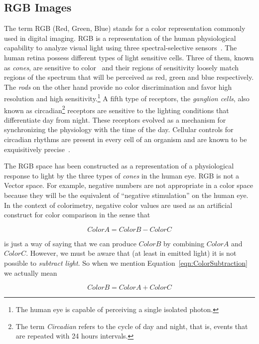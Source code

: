 \subsection{RGB Images}

The term RGB (Red, Green, Blue) stands for a color representation commonly used
in digital imaging. RGB is a representation of the human physiological
capability to analyze visual light using three spectral-selective
sensors~\cite{Malacara2002,Wyszecki2000}. The human retina possess different
types of light sensitive cells. Three of them, known as \emph{cones}, are
sensitive to color~\cite{Gray2003} and their regions of sensitivity loosely
match regions of the spectrum that will be perceived as red, green and blue
respectively. The \emph{rods} on the other hand provide no color discrimination
and favor high resolution and high sensitivity.\footnote{The human eye is
capable of perceiving a single isolated photon.} A fifth type of receptors,
the \emph{ganglion cells}, also known as circadian\footnote{The term
\emph{Circadian} refers to the cycle of day and night, that is, events that are
repeated with 24 hours intervals.} receptors are sensitive to the lighting
conditions that differentiate day from night. These receptors evolved as a
mechanism for synchronizing the physiology with the time of the day. Cellular
controls for circadian rhythms are present in every cell of an organism and are
known to be exquisitively precise~\cite{Lodish2000}.

The RGB space has been constructed as a representation of a physiological
response to light by the three types of \emph{cones} in the human eye. RGB is
not a Vector space. For example, negative numbers are not appropriate in a
color space because they will be the equivalent of ``negative stimulation'' on
the human eye. In the context of colorimetry, negative color values are used
as an artificial construct for color comparison in the sense that

\begin{equation}
\label{eqn:ColorSubtraction}
         ColorA = ColorB - ColorC
\end{equation}

is just a way of saying that we can produce $ColorB$ by combining $ColorA$ and
$ColorC$. However, we must be aware that (at least in emitted light) it is not
possible to \emph{subtract light}. So when we mention
Equation~\ref{eqn:ColorSubtraction} we actually mean

\begin{equation}
\label{eqn:ColorAddition}
         ColorB = ColorA + ColorC
\end{equation}

